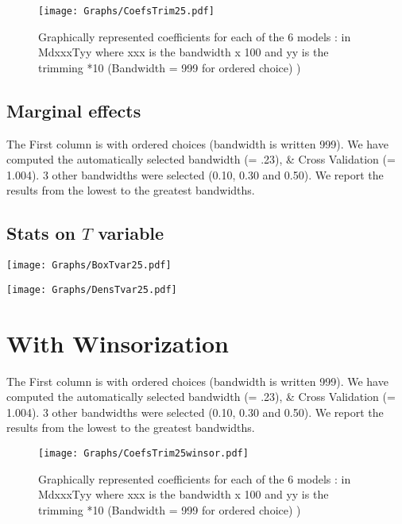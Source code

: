 \documentclass[a4paper]{article}
\begin{document}


\newpage

\begin{sidewaysfigure}[h!]
\caption{Graphically represented coefficients for each of the 6 models : in MdxxxTyy  where xxx is the bandwidth x 100 and yy is the trimming *10 (Bandwidth = 999 for ordered choice) )}\label{PlotFOK}
\texttt{[image: Graphs/CoefsTrim25.pdf]}

\end{sidewaysfigure}
\clearpage

\subsection{Marginal effects}

The First column is with ordered choices (bandwidth is written 999). We  have computed the  automatically selected bandwidth  (= .23), \& Cross Validation (= 1.004). 3 other  bandwidths were selected (0.10, 0.30 and 0.50). We report the results from the lowest to the greatest bandwidths. \\
\newpage
\subsection{Stats on $T$ variable}



\texttt{[image: Graphs/BoxTvar25.pdf]}


\texttt{[image: Graphs/DensTvar25.pdf]}

\section{With Winsorization}
The First column is with ordered choices (bandwidth is written 999). We  have computed the  automatically selected bandwidth  (= .23), \& Cross Validation (= 1.004). 3 other  bandwidths were selected (0.10, 0.30 and 0.50). We report the results from the lowest to the greatest bandwidths. \\



\newpage

\begin{sidewaysfigure}[h!]
\caption{Graphically represented coefficients for each of the 6 models : in MdxxxTyy  where xxx is the bandwidth x 100 and yy is the trimming *10 (Bandwidth = 999 for ordered choice) )}\label{PlotFOK}
\texttt{[image: Graphs/CoefsTrim25winsor.pdf]}

\end{sidewaysfigure}
\clearpage
\end{document}
